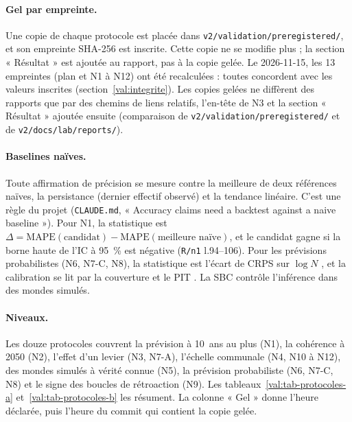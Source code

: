 \paragraph{Gel par empreinte.} Une copie de chaque protocole est placée dans
\texttt{v2/\allowbreak validation/\allowbreak preregistered/}, et son empreinte SHA-256 est inscrite. Cette copie ne se
modifie plus ; la section « Résultat » est ajoutée au rapport, pas à la copie gelée. Le
2026-11-15, les \num{13}\mesure{} empreintes (plan et N1 à N12) ont été recalculées : toutes
concordent avec les valeurs inscrites (section~\ref{val:integrite}). Les copies gelées ne
diffèrent des rapports que par des chemins de liens relatifs, l'en-tête de N3 et la section
« Résultat » ajoutée ensuite (comparaison de \texttt{v2/\allowbreak validation/\allowbreak preregistered/} et de \texttt{v2/\allowbreak docs/\allowbreak lab/\allowbreak reports/}).

\paragraph{Baselines naïves.} Toute affirmation de précision se mesure contre la meilleure de deux
références naïves, la persistance (dernier effectif observé) et la tendance linéaire. C'est une
règle du projet (\texttt{CLAUDE.md}, « Accuracy claims need a backtest against a naive
baseline »). Pour N1, la statistique est
$\Delta = \mathrm{MAPE}(\text{candidat}) - \mathrm{MAPE}(\text{meilleure naïve})$, et le
candidat gagne si la borne haute de l'IC à 95~\% est négative (\texttt{R/n1} l.94--106). Pour les
prévisions probabilistes (N6, N7-C, N8), la statistique est l'écart de CRPS sur $\log N$
\citep{gneiting2007jasa}, et la calibration se lit par la couverture et le PIT
\citep{gneiting2007jrssb}. La SBC \citep{talts2018sbc} contrôle l'inférence dans des mondes
simulés.

\paragraph{Niveaux.} Les douze protocoles couvrent la prévision à 10\suppose{}~ans au plus (N1),
la cohérence à 2050 (N2), l'effet d'un levier (N3, N7-A), l'échelle communale (N4, N10 à N12),
des mondes simulés à vérité connue (N5), la prévision probabiliste (N6, N7-C, N8) et le signe des
boucles de rétroaction (N9). Les tableaux~\ref{val:tab-protocoles-a} et~\ref{val:tab-protocoles-b}
les résument. La colonne « Gel » donne l'heure déclarée, puis l'heure du commit qui contient la
copie gelée.

